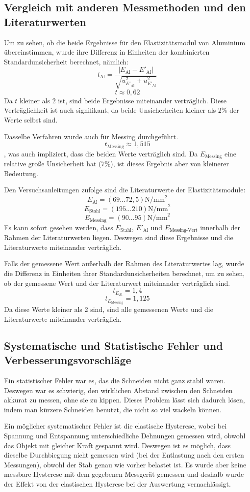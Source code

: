 \documentclass[11pt,a4paper]{article}
\begin{document}
\subsection{Vergleich mit anderen Messmethoden und den Literaturwerten}
Um zu sehen, ob die beide Ergebnisse für den Elastizitätsmodul von Aluminium übereinstimmen, wurde ihre Differenz in Einheiten der kombinierten Standardunsicherheit berechnet, nämlich:
$$ t_\textrm{Al} = \frac{|E_\textrm{Al}-E'_\textrm{Al}|}{
\sqrt{u_{E'_\textrm{Al}}^2+u_{E'_\textrm{Al}}^2}}$$
$$ t \approx 0,62 $$
Da $t$ kleiner als 2 ist, sind beide Ergebnisse miteinander verträglich. Diese Verträglichkeit ist auch signifikant, da beide Unsicherheiten kleiner als 2\% der Werte selbst sind. 

Dasselbe Verfahren wurde auch für Messing durchgeführt.
$$ t_\textrm{Messing} \approx 1,515 $$
, was auch impliziert, dass die beiden Werte verträglich sind. Da $E_\textrm{Messing}$ eine relative große Unsicherheit hat (7\%), ist dieses Ergebnis aber von kleinerer Bedeutung. 

Den Versuchsanleitungen zufolge sind die Literaturwerte der Elastizitätsmodule:
$$E_\textrm{Al} = (69 ... 72,5) \textrm{N/mm}^2$$
$$E_\textrm{Stahl} = (195 ... 210) \textrm{N/mm}^2$$
$$E_\textrm{Messing} = (90 ... 95) \textrm{N/mm}^2$$
Es kann sofort gesehen werden, dass $E_\textrm{Stahl}$, $E'_\textrm{Al}$ und $E_\textrm{Messing-Vert}$ innerhalb der Rahmen der Literaturwerten liegen. Deswegen sind diese Ergebnisse und die Literaturwerte miteinander verträglich. 

Falls der gemessene Wert außerhalb der Rahmen des Literaturwertes lag, wurde die Differenz in Einheiten ihrer Standardunsicherheiten berechnet, um zu sehen, ob der gemessene Wert und der Literaturwert miteinander verträglich sind. 
$$t_{E_\textrm{Al}} = 1,4$$
$$t_{E_\textrm{Messing}} = 1,125$$
Da diese Werte kleiner als 2 sind, sind alle gemessenen Werte und die Literaturwerte miteinander verträglich. 
\subsection{Systematische und Statistische Fehler und Verbesserungsvorschläge}
Ein statistischer Fehler war es, das die Schneiden nicht ganz stabil waren. Deswegen war es schwierig, den wirklichen Abstand zwischen den Schneiden akkurat zu messen, ohne sie zu kippen. Dieses Problem lässt sich dadurch lösen, indem man kürzere Schneiden benutzt, die nicht so viel wackeln können. 

Ein möglicher systematischer Fehler ist die elastische Hysterese, wobei bei Spannung und Entspannung unterschiedliche Dehnungen gemessen wird, obwohl das Objekt mit gleicher Kraft gespannt wird. Deswegen ist es möglich, dass dieselbe Durchbiegung nicht gemessen wird (bei der Entlastung nach den ersten Messungen), obwohl der Stab genau wie vorher belastet ist. Es wurde aber keine messbare Hysterese mit dem gegebenen Messgerät gemessen und deshalb wurde der Effekt von der elastischen Hysterese bei der Auswertung vernachlässigt. 
\end{document}

